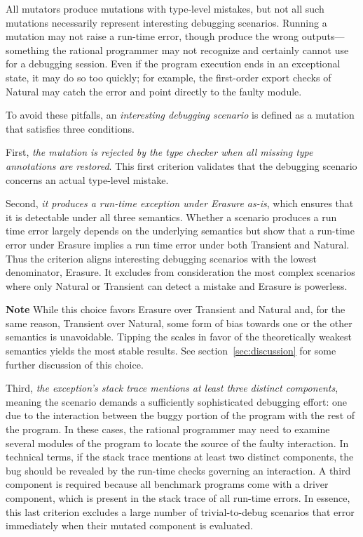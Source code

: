 All mutators produce mutations with type-level mistakes, but not all such
mutations necessarily represent interesting debugging scenarios. Running a
mutation may not raise a run-time error, though produce the wrong
outputs---something the rational programmer may not recognize and certainly
cannot use for a debugging session. Even if the program execution ends in an
exceptional state, it may do so too quickly; for example, the first-order export
checks of Natural may catch the error and point directly to the faulty module.

To avoid these pitfalls, an \emph{interesting debugging scenario} is defined as
a mutation that satisfies three conditions.

First, {\em the mutation is rejected by the type checker when all missing type
annotations are restored\/}. This first criterion validates that the debugging
scenario concerns an actual type-level mistake.

Second, {\em it produces a run-time exception under Erasure as-is\/}, which
ensures that it is detectable under all three semantics.  Whether a scenario
produces a run time error largely depends on the underlying semantics but
\citet{gfd-oopsla-2019} show that a run-time error under Erasure implies a run
time error under both Transient and Natural. Thus the criterion aligns
interesting debugging scenarios with the lowest denominator, Erasure. It
excludes from consideration the most complex scenarios where only Natural or
Transient can detect a mistake and Erasure is powerless.

{\bf Note} While this choice favors Erasure over Transient and Natural and, for
the same reason, Transient over Natural, some form of bias towards one or the
other semantics is unavoidable. Tipping the scales in favor of the theoretically
weakest semantics yields the most stable results. See
section~\ref{sec:discussion} for some further discussion of this choice.

Third, {\em the exception's stack trace mentions at least three distinct
components\/}, meaning the scenario demands a sufficiently sophisticated
debugging effort: one due to the interaction between the buggy portion of the
program with the rest of the program.  In these cases, the rational programmer
may need to examine several modules of the program to locate the source of the
faulty interaction.  In technical terms, if the stack trace mentions at least
two distinct components, the bug should be revealed by the run-time checks
governing an interaction. A third component is required because all benchmark
programs come with a driver component, which is present in the stack trace of
all run-time errors. In essence, this last criterion excludes a large number of
trivial-to-debug scenarios that error immediately when their mutated component
is evaluated.

